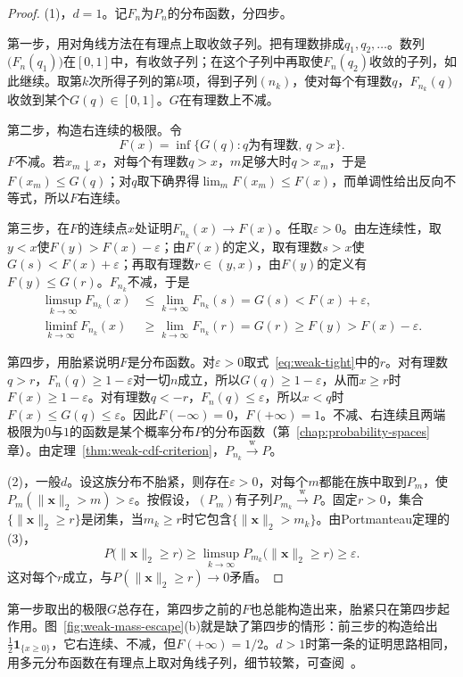 \begin{proof}
(1)，$d=1$。记$F_n$为$P_n$的分布函数，分四步。

第一步，用对角线方法在有理点上取收敛子列。把有理数排成$q_1,q_2,\dots$。数列$\bigl(F_n(q_1)\bigr)$在$[0,1]$中，有收敛子列；在这个子列中再取使$F_n(q_2)$收敛的子列，如此继续。取第$k$次所得子列的第$k$项，得到子列$(n_k)$，使对每个有理数$q$，$F_{n_k}(q)$收敛到某个$G(q)\in[0,1]$。$G$在有理数上不减。

第二步，构造右连续的极限。令
\[
 F(x)=\inf\{G(q):q\text{为有理数},\,q>x\} .
\]
$F$不减。若$x_m\downarrow x$，对每个有理数$q>x$，$m$足够大时$q>x_m$，于是$F(x_m)\leq G(q)$；对$q$取下确界得$\lim_mF(x_m)\leq F(x)$，而单调性给出反向不等式，所以$F$右连续。

第三步，在$F$的连续点$x$处证明$F_{n_k}(x)\to F(x)$。任取$\varepsilon>0$。由左连续性，取$y<x$使$F(y)>F(x)-\varepsilon$；由$F(x)$的定义，取有理数$s>x$使$G(s)<F(x)+\varepsilon$；再取有理数$r\in(y,x)$，由$F(y)$的定义有$F(y)\leq G(r)$。$F_{n_k}$不减，于是
\[
 \begin{aligned}
 \limsup_{k\to\infty}F_{n_k}(x)&\leq\lim_{k\to\infty}F_{n_k}(s)=G(s)<F(x)+\varepsilon,\\
 \liminf_{k\to\infty}F_{n_k}(x)&\geq\lim_{k\to\infty}F_{n_k}(r)=G(r)\geq F(y)>F(x)-\varepsilon .
 \end{aligned}
\]

第四步，用胎紧说明$F$是分布函数。对$\varepsilon>0$取式~\eqref{eq:weak-tight}中的$r$。对有理数$q>r$，$F_n(q)\geq1-\varepsilon$对一切$n$成立，所以$G(q)\geq1-\varepsilon$，从而$x\geq r$时$F(x)\geq1-\varepsilon$。对有理数$q<-r$，$F_n(q)\leq\varepsilon$，所以$x<q$时$F(x)\leq G(q)\leq\varepsilon$。因此$F(-\infty)=0$，$F(+\infty)=1$。不减、右连续且两端极限为$0$与$1$的函数是某个概率分布$P$的分布函数（第~\ref{chap:probability-spaces}章）。由定理~\ref{thm:weak-cdf-criterion}，$P_{n_k}\xrightarrow{\mathrm{w}}P$。

(2)，一般$d$。设这族分布不胎紧，则存在$\varepsilon>0$，对每个$m$都能在族中取到$P_m$，使$P_m(\lVert\bm{x}\rVert_2>m)>\varepsilon$。按假设，$(P_m)$有子列$P_{m_k}\xrightarrow{\mathrm{w}}P$。固定$r>0$，集合$\{\lVert\bm{x}\rVert_2\geq r\}$是闭集，当$m_k\geq r$时它包含$\{\lVert\bm{x}\rVert_2>m_k\}$。由Portmanteau定理的(3)，
\[
 P\bigl(\lVert\bm{x}\rVert_2\geq r\bigr)\geq\limsup_{k\to\infty}P_{m_k}\bigl(\lVert\bm{x}\rVert_2\geq r\bigr)\geq\varepsilon .
\]
这对每个$r$成立，与$P(\lVert\bm{x}\rVert_2\geq r)\to0$矛盾。
\end{proof}

第一步取出的极限$G$总存在，第四步之前的$F$也总能构造出来，胎紧只在第四步起作用。图~\ref{fig:weak-mass-escape}(b)就是缺了第四步的情形：前三步的构造给出$\frac12\mathbf{1}_{\{x\geq0\}}$，它右连续、不减，但$F(+\infty)=1/2$。$d>1$时第一条的证明思路相同，用多元分布函数在有理点上取对角线子列，细节较繁，可查阅~。


